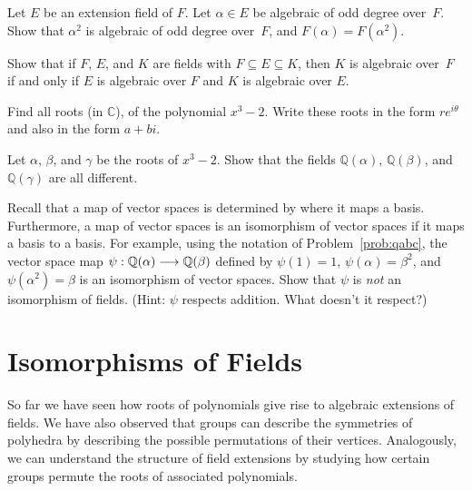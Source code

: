 \begin{problem}
Let $E$ be an extension field of $F$.  Let $\alpha \in E$ be algebraic of odd degree over~$F$.  Show that $\alpha^2$ is algebraic of odd degree over~$F$, and $F(\alpha) = F(\alpha^2)$.
\end{problem}



\begin{problem}
Show that if $F$, $E$, and $K$ are fields with $F \subseteq E \subseteq K$, then $K$ is algebraic over~$F$ if and only if $E$ is algebraic over $F$ and $K$ is algebraic over $E$.
\end{problem}



\begin{problem}
    Find all roots (in $\mathbb{C}$), of the polynomial $x^3-2$. Write these roots in the form $re^{i\theta}$ and also in the form $a+bi$.
\end{problem}



\begin{problem}\label{prob:qabc}
Let $\alpha$, $\beta$, and $\gamma$ be the roots of $x^3-2$.  Show that the fields $\mathbb{Q}(\alpha)$, $\mathbb{Q}(\beta)$,  and $\mathbb{Q}(\gamma)$ are all different.
\end{problem}



\begin{problem}
    Recall that a map of vector spaces is determined by where it maps a basis. Furthermore, a map of vector spaces is an isomorphism of vector spaces if it maps a basis to a basis. For example, using the notation of Problem~\ref{prob:qabc}, the vector space map $\psi:\mathbb{Q}(\alpha) \longrightarrow \mathbb{Q}(\beta)$ defined by $\psi(1)=1$, $\psi(\alpha)=\beta^2$, and $\psi(\alpha^2)=\beta$ is an isomorphism of vector spaces. Show that $\psi$ is \textit{not} an isomorphism of fields. (Hint: $\psi$ respects addition. What doesn't it respect?)
\end{problem}

\chapter{Isomorphisms of Fields}

So far we have seen how roots of polynomials give rise to algebraic extensions of fields. We have also observed that groups can describe the symmetries of polyhedra by describing the possible permutations of their vertices. Analogously, we can understand the structure of field extensions by studying how certain groups permute the roots of associated polynomials.

